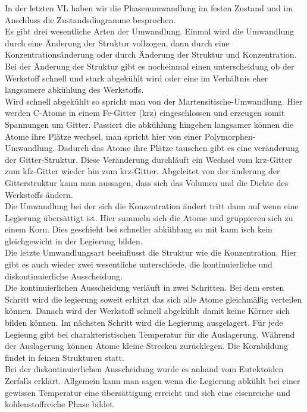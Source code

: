 \documentclass[12pt]{scrreprt}
\begin{document}
In der letzten VL haben wir die Phasenumwandlung im festen Zustand und im Anschluss die Zustandsdiagramme besprochen.\\
Es gibt drei wesentliche Arten der Umwandlung. Einmal wird die Umwandlung durch eine Änderung der Struktur vollzogen, dann durch eine Konzentrationsänderung oder durch Änderung der Struktur und Konzentration.\\[0,3cm]
Bei der Änderung der Struktur gibt es nocheinmal einen unterscheidung ob der Werkstoff schnell und stark abgekühlt wird oder eine im Verhältnis eher langsamere abkühlung des Werkstoffs.\\
Wird schnell abgekühlt so spricht man von der Martensitische-Umwandlung. Hier werden C-Atome in einem Fe-Gitter (krz) eingeschlossen und erzeugen somit Spannungen um Gitter.
Passiert die abkühlung hingehen langsamer können die Atome ihre Plätze wechsel, man spricht hier von einer Polymorphen-Umwandlung. Dadurch das Atome ihre Plätze tauschen gibt es eine veränderung der Gitter-Struktur.
Diese Veränderung durchläuft ein Wechsel vom krz-Gitter zum kfz-Gitter wieder hin zum krz-Gitter. Abgeleitet von der änderung der Gitterstruktur kann man aussagen, dass sich das Volumen und die Dichte des Werkstoffs ändern.\\[0,2cm]
Die Umwandlung bei der sich die Konzentration ändert tritt dann auf wenn eine Legierung übersättigt ist. Hier sammeln sich die Atome und gruppieren sich zu einem Korn. Dies geschieht bei schneller abkühlung so mit kann isch kein gleichgewicht in der Legierung bilden.\\[0,2cm]
Die letzte Umwandlungsart beeinflusst die Struktur wie die Konzentration. Hier gibt es auch wieder zwei wesentliche unterschiede, die kontinuierliche und diskontinuierliche Ausscheidung.\\
Die kontinuierlichen Ausscheidung verläuft in zwei Schritten. Bei dem ersten Schritt wird die legierung soweit erhitzt das sich alle Atome gleichmäßig verteilen können. Danach wird der Werkstoff schnell abgekühlt damit keine Körner sich bilden können.
Im nächsten Schritt wird die Legierung ausgelagert. Für jede Legieung gibt bei charakteristischen Temperatur für die Auslagerung. Während der Auslagerung können Atome kleine Strecken zurücklegen. Die Kornbildung findet in feinen Strukturen statt. \\
Bei der diskontinuierlichen Ausscheidung wurde es anhand vom Eutektoiden Zerfalls erklärt. Allgemein kann man sagen wenn die Legierung abkühlt bei einer gewissen Temperatur eine übersättigung erreicht und sich eine eisenreiche und kohlenstoffreiche Phase bildet.\\[0,2cm]
\end{document}
